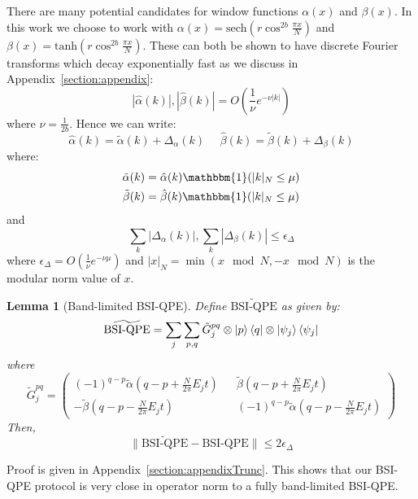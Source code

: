 \documentclass[aps,floatfix,10pt,amssymb,amsfont,amsmath,superscriptaddress,float,nofootinbib,longbibliography,nobalancelastpage,twocolumn]{revtex4-2}
\newtheorem{lemma}{Lemma}
\begin{document}
There are many potential candidates for window functions $\alpha(x)$ and $\beta(x)$. In this work we choose to work with $\alpha(x) = \text{sech}( r\cos^{2b} \frac{\pi x}{N})$ and $\beta(x) = \text{tanh}(r \cos^{2b} \frac{\pi x}{N})$. These can both be shown to have discrete Fourier transforms which decay exponentially fast as we discuss in Appendix~\ref{section:appendix}:
\begin{equation}
    |\hat \alpha(k)|,|\hat \beta(k)| = O\left( \frac{1}{\nu}e^{-\nu |k|}\right)
    \label{eq:scaling}
\end{equation}
where $\nu = \frac{1}{2b}$. Hence we can write:
\begin{equation}
    \hat\alpha(k) = \tilde\alpha(k) + \Delta_{\alpha}(k) \>\>\>\>\>\>\hat\beta(k) = \tilde\beta(k) + \Delta_{\beta}(k)
    \label{eq:decomposealpha}
\end{equation}
where:
\begin{align}
    \tilde\alpha(k) &= \hat\alpha(k)\mathbbm{1}(|k|_{N}\leq \mu)\\
    \tilde\beta(k) &= \hat\beta(k)\mathbbm{1}(|k|_{N}\leq \mu)
    \label{eq:decomposealpha2}
\end{align}  and
\begin{equation}
    \sum_k|\Delta_\alpha(k)|,\sum_k|\Delta_\beta(k)|\leq \epsilon_{\Delta}
    \label{eq:decomposealpha3}
\end{equation} where $\epsilon_{\Delta} = O(\frac{1}{\nu}e^{-\nu \mu})$ and $|x|_N = \min(x \mod N,- x\mod N)$ is the modular norm value of $x$.

\begin{lemma}[Band-limited BSI-QPE]
\label{lemma:0}
    Define $\widetilde{\text{BSI-QPE}}$ as given by:
    \begin{equation}
       \widetilde{\text{BSI-QPE}}= \sum_j \sum_{p,q} \tilde G^{pq}_j \otimes \ket{p}\bra{q} \otimes \ket{\psi_j}\bra{\psi_j}
    \end{equation}
    where 
    \begin{equation}
        \tilde G^{pq}_j = \left(\begin{smallmatrix}
        (-1)^{q-p}\tilde\alpha(q-p+\frac{N}{2\pi}E_jt) && \tilde\beta(q-p+\frac{N}{2\pi}E_jt)\\
        -\tilde\beta (q-p-\frac{N}{2\pi}E_jt) && (-1)^{q-p}\tilde\alpha(q-p-\frac{N}{2\pi}E_jt)
    \end{smallmatrix}\right)
    \end{equation}
    Then,  
    \begin{equation}
        \|\widetilde{\text{BSI-QPE}}-\text{BSI-QPE}\| \leq 2\epsilon_{\Delta}
    \end{equation}
\end{lemma}
Proof is given in Appendix~\ref{section:appendixTrunc}. This shows that our BSI-QPE protocol is very close in operator norm to a fully band-limited BSI-QPE.
\end{document}
